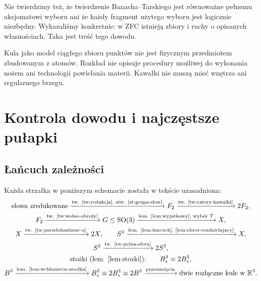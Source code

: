 \documentclass[11pt,a4paper]{article}
\numberwithin{equation}{section}
\theoremstyle{plain}
\theoremstyle{definition}
\theoremstyle{remark}
\newcommand{\R}{\mathbb R}
\begin{document}
Nie twierdzimy też, że twierdzenie Banacha--Tarskiego jest równoważne pełnemu aksjomatowi wyboru ani że każdy fragment użytego wyboru jest logicznie niezbędny. Wykazaliśmy konkretnie: w ZFC istnieją zbiory i ruchy o opisanych własnościach. Taka jest treść tego dowodu.

Kula jako model ciągłego zbioru punktów nie jest fizycznym przedmiotem zbudowanym z atomów. Rozkład nie opisuje procedury możliwej do wykonania nożem ani technologii powielania materii. Kawałki nie muszą mieć wnętrza ani regularnego brzegu.

\section{Kontrola dowodu i najczęstsze pułapki}
\subsection{Łańcuch zależności}
Każda strzałka w poniższym schemacie została w tekście uzasadniona:
\[
\begin{gathered}
\text{słowa zredukowane}\xrightarrow{\text{tw. \ref{tw:redukcja}, stw. \ref{st:grupa-slow}}}F_2
\xrightarrow{\text{tw. \ref{tw:cztery-kawalki}}}2F_2,\\
F_2\xrightarrow{\text{tw. \ref{tw:wolne-obroty}}}G\le\mathrm{SO}(3)
\xrightarrow{\text{lem. \ref{lem:wyjatkowy}, wybór }T}X,\\
X\xrightarrow{\text{tw. \ref{tw:paradoksalnosc-x}}}2X,
\qquad S^2\xrightarrow{\text{lem. \ref{lem:lancuch}, \ref{lem:obrot-rozdzielajacy}}}X,\\
S^2\xrightarrow{\text{tw. \ref{tw:pelna-sfera}}}2S^2,\\
\text{stożki (lem. \ref{lem:stozki}):}\qquad B^3_*\equiv2B^3_*,\\
B^3\xrightarrow{\text{lem. \ref{lem:wchloniecie-srodka}}}B^3_*
\equiv2B^3_*\equiv2B^3
\xrightarrow{\text{przesunięcia}}\text{dwie rozłączne kule w }\R^3.
\end{gathered}
\]
\end{document}
